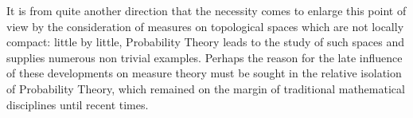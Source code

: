 It is from quite another direction that the necessity comes to enlarge this point of view by the consideration of measures on topological spaces which are not locally compact: little by little, Probability Theory leads to the study of such spaces and supplies numerous non trivial examples. Perhaps the reason for the late influence of these developments on measure theory must be sought in the relative isolation of Probability Theory, which remained on the margin of traditional mathematical disciplines until recent times.

